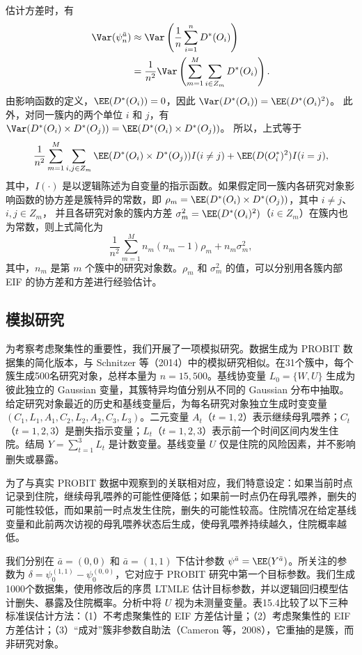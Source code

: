估计方差时，有
\[
\begin{aligned}
 \Var(\psi_n^{\bar a})
 &\approx\Var\left(\frac{1}{n}\sum_{i=1}^{n}D^*(O_i)\right)\\
 &=\frac{1}{n^2}\Var\left(\sum_{m=1}^{M}\sum_{i\in Z_m}D^*(O_i)\right).
\end{aligned}
\]
由影响函数的定义，$\EE(D^*(O_i))=0$，因此
$\Var(D^*(O_i))=\EE(D^*(O_i)^2)$。
此外，对同一簇内的两个单位 $i$ 和 $j$，有
$\Var(D^*(O_i)\times D^*(O_j))=\EE(D^*(O_i)\times D^*(O_j))$。
所以，上式等于
\[
 \frac{1}{n^2}\sum_{m=1}^{M}\sum_{i,j\in Z_m}
 \EE(D^*(O_i)\times D^*(O_j))I(i\ne j)
 +\EE(D(O_i^*)^2)I(i=j),
\]
其中，$I(\cdot)$ 是以逻辑陈述为自变量的指示函数。如果假定同一簇内各研究对象影响函数的协方差是簇特异的常数，即
$\rho_m=\EE(D^*(O_i)\times D^*(O_j))$，其中 $i\ne j$、$i,j\in Z_m$，
并且各研究对象的簇内方差 $\sigma_m^2=\EE(D^*(O_i)^2)$（$i\in Z_m$）在簇内也为常数，则上式简化为
\[
 \frac{1}{n^2}\sum_{m=1}^{M}n_m(n_m-1)\rho_m+n_m\sigma_m^2,
\]
其中，$n_m$ 是第 $m$ 个簇中的研究对象数。$\rho_m$ 和 $\sigma_m^2$ 的值，可以分别用各簇内部 EIF 的协方差和方差进行经验估计。

\subsection{模拟研究}

为考察考虑聚集性的重要性，我们开展了一项模拟研究。数据生成为 PROBIT 数据集的简化版本，与 Schnitzer 等（2014）中的模拟研究相似。在31个簇中，每个簇生成500名研究对象，总样本量为 $n=15{,}500$。基线协变量 $L_0=\{W,U\}$ 生成为彼此独立的 Gaussian 变量，其簇特异均值分别从不同的 Gaussian 分布中抽取。给定研究对象最近的历史和基线变量后，为每名研究对象独立生成时变变量 $(C_1,L_1,A_1,C_2,L_2,A_2,C_3,L_3)$。二元变量 $A_t$（$t=1,2$）表示继续母乳喂养；$C_t$（$t=1,2,3$）是删失指示变量；$L_t$（$t=1,2,3$）表示前一个时间区间内发生住院。结局 $Y=\sum_{t=1}^{3}L_t$ 是计数变量。基线变量 $U$ 仅是住院的风险因素，并不影响删失或暴露。

为了与真实 PROBIT 数据中观察到的关联相对应，我们特意设定：如果当前时点记录到住院，继续母乳喂养的可能性便降低；如果前一时点仍在母乳喂养，删失的可能性较低，而如果前一时点发生住院，删失的可能性较高。住院情况在给定基线变量和此前两次访视的母乳喂养状态后生成，使母乳喂养持续越久，住院概率越低。

我们分别在 $\bar a=(0,0)$ 和 $\bar a=(1,1)$ 下估计参数 $\psi^{\bar a}=\EE(Y^{\bar a})$。所关注的参数为
$\delta=\psi_0^{(1,1)}-\psi_0^{(0,0)}$，它对应于 PROBIT 研究中第一个目标参数。我们生成1000个数据集，使用修改后的序贯 LTMLE 估计目标参数，并以逻辑回归模型估计删失、暴露及住院概率。分析中将 $U$ 视为未测量变量。表15.4比较了以下三种标准误估计方法：（1）不考虑聚集性的 EIF 方差估计量；（2）考虑聚集性的 EIF 方差估计；（3）“成对”簇非参数自助法（Cameron 等，2008），它重抽的是簇，而非研究对象。

